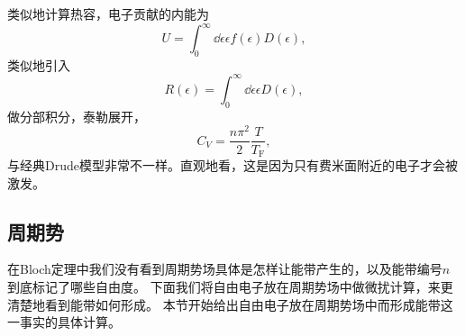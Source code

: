 类似地计算热容，电子贡献的内能为
\[
    U = \int_0^\infty \dd{\epsilon} \epsilon f(\epsilon) D(\epsilon),
\]
类似地引入
\[
    R(\epsilon) = \int_0^\infty \dd{\epsilon} \epsilon D(\epsilon),
\]
做分部积分，泰勒展开，
\begin{equation}
    C_V = \frac{n \pi^2}{2} \frac{T}{T_\text{F}},
    \label{eq:free-electron-special-heat}
\end{equation}
与经典Drude模型非常不一样。直观地看，这是因为只有费米面附近的电子才会被激发。

\subsection{周期势}\label{sec:periodic-potential-electron}

在Bloch定理中我们没有看到周期势场具体是怎样让能带产生的，以及能带编号$n$到底标记了哪些自由度。
下面我们将自由电子放在周期势场中做微扰计算，来更清楚地看到能带如何形成。
本节开始给出自由电子放在周期势场中而形成能带这一事实的具体计算。




